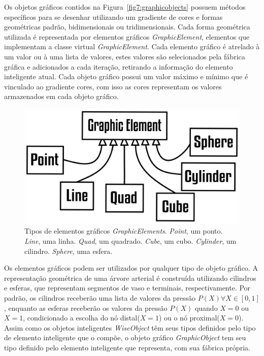 \documentclass[a4paper,12pt]{monografia}
\theoremstyle{plain}
\theoremstyle{definition}
\theoremstyle{remark}
\begin{document}
Os objetos gráficos contidos na Figura~\ref{fig7:graphicobjects} possuem métodos específicos para se desenhar utilizando um gradiente de cores e formas geométricas padrão, bidimensionais ou tridimensionais. Cada forma geométrica utilizada é representada por elementos gráficos \textit{GraphicElement}, elementos que implementam a classe virtual \textit{GraphicElement}. Cada elemento gráfico é atrelado à um valor ou à uma lista de valores, estes valores são selecionados pela fábrica gráfica e adicionados a cada iteração, retirando a informação do elemento inteligente atual. Cada objeto gráfico possui um valor máximo e mínimo que é vinculado ao gradiente cores, com isso as cores representam os valores armazenados em cada objeto gráfico.

\begin{figure}[!htbp]
	\centering
	\includegraphics[scale=2]{Figures/GraphicElements@16x.png}
	\caption{Tipos de elementos gráficos \textit{GraphicElements}. \textit{Point}, um ponto. \textit{Line}, uma linha. \textit{Quad}, um quadrado. \textit{Cube}, um cubo. \textit{Cylinder}, um cilindro. \textit{Sphere}, uma esfera.}
	\label{fig7:graphicelements}
\end{figure}

Os elementos gráficos podem ser utilizados por qualquer tipo de objeto gráfico. A representação geométrica de uma árvore arterial é construída utilizando cilindros e esferas, que representam segmentos de vaso e terminais, respectivamente. Por padrão, os cilindros receberão uma lista de valores da pressão $P(X) \forall X \in [0,1]$, enquanto as esferas receberão os valores da pressão $P(X)$ quando $X=0$ ou $X=1$, condicionado a escolha do nó distal($X=1$) ou o nó proximal($X=0$).  Assim como os objetos inteligentes \textit{WiseObject} têm seus tipos definidos pelo tipo de elemento inteligente que o compõe, o objeto gráfico \textit{GraphicObject} tem seu tipo definido pelo elemento inteligente que representa, com sua fábrica própria.
\end{document}
